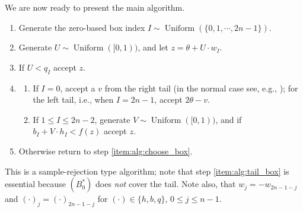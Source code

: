 \documentclass{article}
\theoremstyle{definition} %
\DeclareMathOperator{\DUnif}{\mathrm{Uniform}} %
\newcommand{\nolabel}[1]{}
\newcommand{\Mode}{\theta}
\begin{document}
    We are now ready to present the main algorithm.
    \begin{enumerate}
        \item \label{item:alg:choose_box} Generate the zero-based box index $I \sim \DUnif (\{ 0, 1, \cdots , 2 n - 1 \})$.

        \item \nolabel{item:alg:horizontal} Generate $U \sim \DUnif ([0, 1))$, and let $z = \Mode + U \cdot w_I$.

        \item \nolabel{item:alg:inside_simple} If $U < q_I$ accept $z$.

        \item %
            \begin{enumerate}
                \item \label{item:alg:tail_box} If $I = 0$, accept a $v$ from the right tail (in the normal case see, e.g., \citet{Marsaglia:64}); for the left tail, i.e., when $I = 2 n - 1$, accept $2 \Mode - v$.

                \item If $1 \le I \le 2 n - 2$, generate $V \sim \DUnif ([0, 1))$, and if $b_I + V \cdot h_I < f(z)$ accept $z$.
            \end{enumerate}

        \item Otherwise return to step \ref{item:alg:choose_box}.
    \end{enumerate}
    This is a sample-rejection type algorithm; note that step \ref{item:alg:tail_box} is essential because $\left( B_0^* \right)$ does \emph{not} cover the tail.
    Note also, that $w_j = -w_{2n - 1 - j}$ and $(\cdot ) _j = (\cdot ) _{2n - 1 - j}$ for $(\cdot ) \in \{ h, b, q \}$, $0 \leq j \leq n - 1$.
\end{document}
